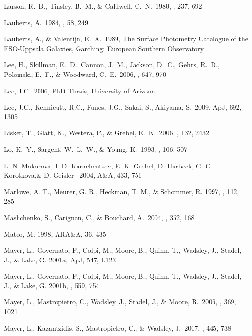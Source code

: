\documentclass[preprint]{aastex}
\begin{document}
\begin{thebibliography}{}
Larson, R.~B., Tinsley, B.~M., \& Caldwell, C.~N.\ 1980, \apj, 237, 692 

Lauberts, A.\ 1984, \aaps, 58, 249 

Lauberts, A., \& Valentijn, E.~A.\ 1989,
The Surface Photometry Catalogue of the ESO‐Uppsala Galaxies,
Garching: European Southern Observatory  

Lee, H., Skillman, E.~D., Cannon, J.~M., Jackson, D.~C., Gehrz, R.~D., 
Polomski, E.~F., \& Woodward, C.~E.\ 2006, \apj, 647, 970 

Lee, J.C.\ 2006, PhD Thesis, University of Arizona

Lee, J.C., Kennicutt, R.C., Funes, J.G., Sakai, S., Akiyama, S.\ 2009, ApJ, 692, 1305

Lisker, T., Glatt, K., Westera, P., \& Grebel, E.~K.\ 2006, \aj, 132, 2432

Lo, K.~Y., Sargent, W.~L.~W., \& Young, K.\ 1993, \aj, 106, 507 

L. N. Makarova, I. D. Karachentsev, E. K. Grebel, D. Harbeck, G. G. Korotkova,\&
D. Geisler \ 2004, A\&A, 433, 751

Marlowe, A. T., Meurer, G. R., Heckman, T. M., \& Schommer, R. 1997, 
\apjs , 112, 285

Mashchenko, S., Carignan, C., \& Bouchard, A.\ 2004, \mnras, 352, 168 

Mateo, M. 1998, ARA\&A, 36, 435

Mayer, L., Governato, F., Colpi, M., Moore, B., Quinn, T., Wadsley, J., 
Stadel, J., \& Lake, G. 2001a, ApJ, 547, L123

Mayer, L., Governato, F., Colpi, M., Moore, B., Quinn, T., Wadsley, J., 
Stadel, J., \& Lake, G. 2001b, \apj, 559, 754 

Mayer, L., Mastropietro, C., Wadsley, J., Stadel, J., \& 
   Moore, B.\ 2006, \mnras, 369, 1021

Mayer, L., Kazantzidis, S., Mastropietro, C., \& Wadsley, J.\ 2007, \nat, 445, 738 


\end{thebibliography}
\end{document}
